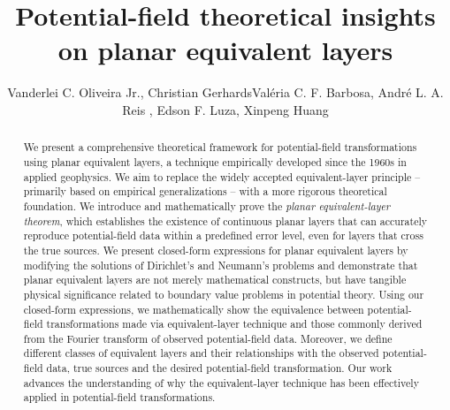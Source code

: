 \documentclass[manuscript,noblind]{geophysics}
\begin{document}
	\title{Potential-field theoretical insights on planar equivalent layers}
	
	\renewcommand{\thefootnote}{\fnsymbol{footnote}} 
	
	
	\address{
		\footnotemark[1] Corresponding author: vanderlei@on.br
		\footnotemark[2] Observat\'orio Nacional, Rio de Janeiro, Brazil\\
		\footnotemark[3] Universidade do Estado do Rio de Janeiro, Rio de Janeiro, Brazil\\
		\footnotemark[4] TU Bergakademie Freiberg, Institute of Geophysics and Geoinformatics, Freiberg, Germany
	}
	\author{Vanderlei C. Oliveira Jr.\footnotemark[2]\footnotemark[1], Christian Gerhards\footnotemark[4]
		Val\'eria C. F. Barbosa\footnotemark[2], Andr\'e L. A. Reis \footnotemark[3],
		Edson F. Luza\footnotemark[2], Xinpeng Huang\footnotemark[4]}
	
	
	\maketitle
	
	\begin{abstract}
		We present a comprehensive theoretical framework for potential-field transformations 
		using planar equivalent layers, a technique empirically developed since the 1960s in applied
		geophysics. We aim to replace the widely accepted equivalent-layer principle – primarily
		based on empirical generalizations – with a more rigorous theoretical foundation. We 
		introduce and mathematically prove the \textit{planar equivalent-layer theorem}, which establishes
		the existence of continuous planar layers that can accurately reproduce potential-field data
		within a predefined error level, even for layers that cross the true sources.
		We present closed-form expressions for planar equivalent layers by modifying the solutions of
		Dirichlet’s and Neumann’s problems and demonstrate that planar equivalent layers are not merely
		mathematical constructs, but have tangible physical significance related to boundary value problems 
		in potential theory.
		Using our closed-form expressions, we mathematically show the equivalence between potential-field
		transformations made via equivalent-layer technique and those commonly derived from the Fourier
		transform of observed potential-field data.
		Moreover, we define different classes of equivalent layers and their relationships with 
		the observed potential-field data, true sources and the desired potential-field transformation.
		Our work advances the understanding of why the equivalent-layer technique has been
		effectively applied in potential-field transformations.
	\end{abstract}
	
\end{document}
